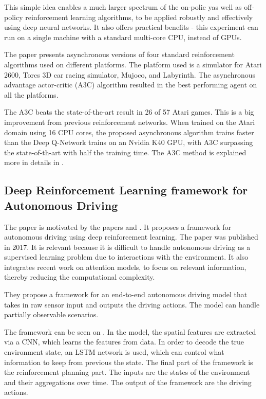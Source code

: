 This simple idea enables a much larger spectrum of the on-polic yas well as off-policy reinforcement learning algorithms, to be applied robustly and effectively using deep neural networks. It also offers practical benefits - this experiment can run on a single machine with a standard multi-core CPU, instead of GPUs.

The paper presents asynchronous versions of four standard reinforcement algorithms used on different platforms. The platform used is a simulator for Atari 2600, Torcs 3D car racing simulator, Mujoco, and Labyrinth. The asynchronous advantage actor-critic (A3C) algorithm resulted in the best performing agent on all the platforms.

The A3C beats the state-of-the-art result in 26 of 57 Atari games. This is a big improvement from previous reinforcement networks. When trained on the Atari domain using 16 CPU cores, the proposed asynchronous algorithm trains faster than the Deep Q-Network trains on an Nvidia K40 GPU, with A3C surpassing the state-of-th-art with half the training time. The A3C method is explained more in details in .
   
\subsection{Deep Reinforcement Learning framework for Autonomous Driving} 
The paper \cite{Sallab:2017:2470-1173:70} is motivated by the papers \cite{DBLP:journals/corr/MnihKSGAWR13} and \cite{Silver_2016}. It proposes a framework for autonomous driving using deep reinforcement learning. The paper was published in 2017. It is relevant because it is difficult to handle autonomous driving as a supervised learning problem due to interactions with the environment. It also integrates recent work on attention models, to focus on relevant information, thereby reducing the computational complexity.

They propose a framework for an end-to-end autonomous driving model that takes in raw sensor input and outputs the driving actions. The model can handle partially observable scenarios.  

The framework can be seen on . In the model, the spatial features are extracted via a CNN, which learns the features from data. In order to decode the true environment state, an LSTM network is used, which can control what information to keep from previous the state. The final part of the framework is the reinforcement planning part. The inputs are the states of the environment and their aggregations over time. The output of the framework are the driving actions.  
 
